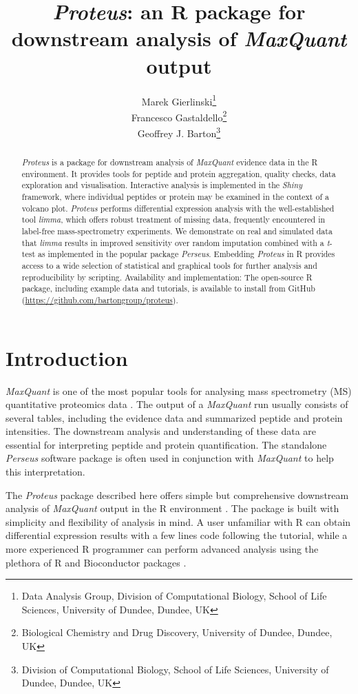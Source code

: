 \documentclass[]{article}
\title{\emph{Proteus}: an R package for downstream analysis of \emph{MaxQuant}
output}
\author{Marek Gierlinski\footnote{Data Analysis Group, Division of Computational
  Biology, School of Life Sciences, University of Dundee, Dundee, UK} \\ Francesco Gastaldello\footnote{Biological Chemistry and Drug Discovery,
  University of Dundee, Dundee, UK} \\ Geoffrey J. Barton\footnote{Division of Computational Biology, School of
  Life Sciences, University of Dundee, Dundee, UK}}
\date{}
\begin{document}
\maketitle
\begin{abstract}
\emph{Proteus} is a package for downstream analysis of \emph{MaxQuant}
evidence data in the R environment. It provides tools for peptide and
protein aggregation, quality checks, data exploration and visualisation.
Interactive analysis is implemented in the \emph{Shiny} framework, where
individual peptides or protein may be examined in the context of a
volcano plot. \emph{Proteus} performs differential expression analysis
with the well-established tool \emph{limma}, which offers robust
treatment of missing data, frequently encountered in label-free
mass-spectrometry experiments. We demonstrate on real and simulated data
that \emph{limma} results in improved sensitivity over random imputation
combined with a \emph{t}-test as implemented in the popular package
\emph{Perseus}. Embedding \emph{Proteus} in R provides access to a wide
selection of statistical and graphical tools for further analysis and
reproducibility by scripting. Availability and implementation: The
open-source R package, including example data and tutorials, is
available to install from GitHub
(\url{https://github.com/bartongroup/proteus}).
\end{abstract}

\section{Introduction}\label{introduction}

\emph{MaxQuant} is one of the most popular tools for analysing mass
spectrometry (MS) quantitative proteomics data \citep{coxmann2008}. The
output of a \emph{MaxQuant} run usually consists of several tables,
including the evidence data and summarized peptide and protein
intensities. The downstream analysis and understanding of these data are
essential for interpreting peptide and protein quantification. The
standalone \emph{Perseus} software package \citep{tyanova2016} is often
used in conjunction with \emph{MaxQuant} to help this interpretation.

The \emph{Proteus} package described here offers simple but
comprehensive downstream analysis of \emph{MaxQuant} output in the R
environment \citep{R2018}. The package is built with simplicity and
flexibility of analysis in mind. A user unfamiliar with R can obtain
differential expression results with a few lines code following the
tutorial, while a more experienced R programmer can perform advanced
analysis using the plethora of R and Bioconductor packages
\citep{bioconductor2015}.
\end{document}
